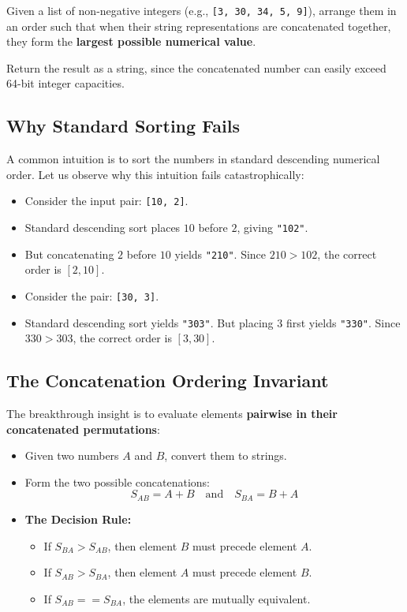 \documentclass[10pt,journal,compsoc,onecolumn]{IEEEtran}
\begin{document}
Given a list of non-negative integers (e.g., \texttt{[3, 30, 34, 5, 9]}), arrange them in an order such that when their string representations are concatenated together, they form the \textbf{largest possible numerical value}.

Return the result as a string, since the concatenated number can easily exceed 64-bit integer capacities.

\subsection{Why Standard Sorting Fails}

A common intuition is to sort the numbers in standard descending numerical order. Let us observe why this intuition fails catastrophically:
\begin{itemize}
    \item Consider the input pair: \texttt{[10, 2]}.
    \item Standard descending sort places $10$ before $2$, giving \texttt{"102"}.
    \item But concatenating $2$ before $10$ yields \texttt{"210"}. Since $210 > 102$, the correct order is $[2, 10]$.
    \item Consider the pair: \texttt{[30, 3]}.
    \item Standard descending sort yields \texttt{"303"}. But placing $3$ first yields \texttt{"330"}. Since $330 > 303$, the correct order is $[3, 30]$.
\end{itemize}

\subsection{The Concatenation Ordering Invariant}

The breakthrough insight is to evaluate elements \textbf{pairwise in their concatenated permutations}:
\begin{itemize}
    \item Given two numbers $A$ and $B$, convert them to strings.
    \item Form the two possible concatenations:
    \[
    S_{AB} = A + B \quad \text{and} \quad S_{BA} = B + A
    \]
    \item \textbf{The Decision Rule:}
    \begin{itemize}
        \item If $S_{BA} > S_{AB}$, then element $B$ must precede element $A$.
        \item If $S_{AB} > S_{BA}$, then element $A$ must precede element $B$.
        \item If $S_{AB} == S_{BA}$, the elements are mutually equivalent.
    \end{itemize}
\end{itemize}
\end{document}
